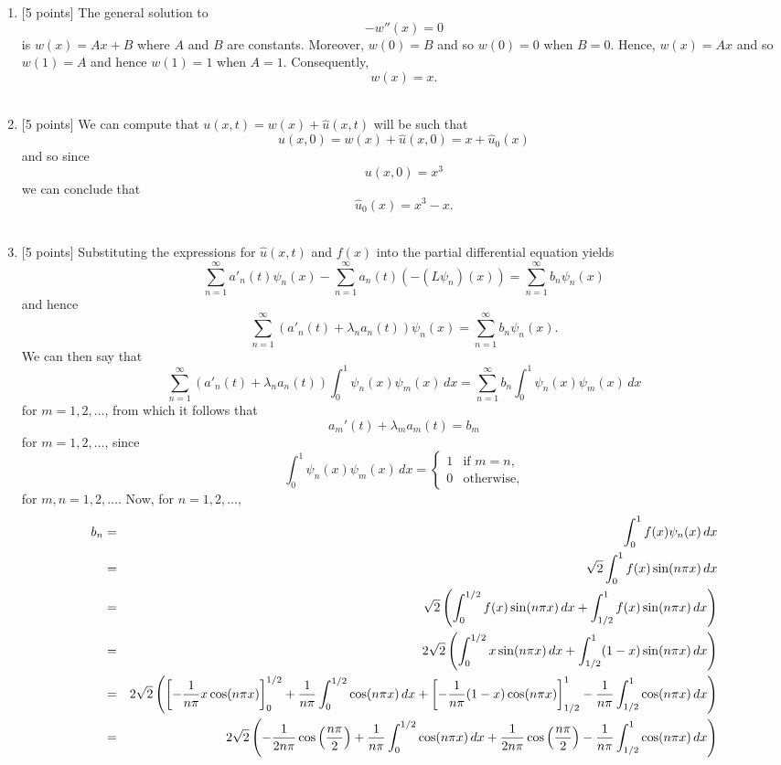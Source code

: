 \begin{solution}
\begin{enumerate}
\item {[5 points]} The general solution to
\[
-w''(x)=0
\]
is $w(x)=Ax+B$ where $A$ and $B$ are constants. Moreover, $w(0)=B$ and so $w(0)=0$ when $B=0$. Hence, $w(x)=Ax$ and so $w(1)=A$ and hence $w(1)=1$ when $A=1$. Consequently,
\[
w(x)=x.
\]
\\
\item {[5 points]} We can compute that $u(x,t)=w(x)+\hat{u}(x,t)$ will be such that
\[
u(x,0)=w(x)+\hat{u}(x,0)=x+\hat{u}_0(x)
\]
and so since
\[
u(x,0)=x^3
\]
we can conclude that
\[
\hat{u}_0(x)=x^3-x.
\]
\\
\item {[5 points]} Substituting the expressions for $\hat{u}(x,t)$ and $f(x)$ into the partial differential equation yields
\[
\sum_{n=1}^\infty a'_n(t) \psi_n (x)-\sum_{n=1}^\infty a_n(t) \left(-\left(L\psi_n\right) (x)\right)=\sum_{n=1}^\infty b_n \psi_n (x)
\]
and hence
\[
\sum_{n=1}^\infty \left(a'_n(t)+\lambda_na_n(t)\right)\psi_n (x)=\sum_{n=1}^\infty b_n \psi_n (x).
\]
We can then say that
\[
\sum_{n=1}^\infty \left(a'_n(t)+\lambda_na_n(t)\right)\int_0^1\psi_n (x)\psi_m (x)\,dx=\sum_{n=1}^\infty b_n \int_0^1\psi_n (x)\psi_m (x)\,dx
\]
for $m=1,2,\ldots$, from which it follows that
\[
a_m'(t)+\lambda_m a_m(t)=b_m
\]
for $m=1,2,\ldots$, since
\[
\int_0^1\psi_n (x)\psi_m (x)\,dx = \left\{\begin{array}{ll} 1 & \mbox{if }m=n, \\ 0 & \mbox{otherwise,} \end{array}\right.
\]
for $m,n=1,2,\ldots$. Now, for $n=1,2,\ldots$,
\begin{eqnarray*}
b_n&=&\int_0^1f(x)\psi_n(x)\,dx
\\
&=&\sqrt{2}\int_0^1 f(x)\sin(n\pi x)\,dx
\\
&=& \sqrt{2}\left(\int_0^{1/2} f(x)\sin(n\pi x)\,dx+\int_{1/2}^1 f(x)\sin(n\pi x)\,dx\right)
\\
&=& 2\sqrt{2}\left(\int_0^{1/2} x\sin(n\pi x)\,dx+\int_{1/2}^1 (1-x)\sin(n\pi x)\,dx\right)
\\
&=&2\sqrt{2}\left(\left[-{1 \over n\pi}x\cos(n\pi x)\right]_0^{1/2}+{1 \over n\pi}\int_0^{1/2} \cos(n\pi x)\,dx+\left[-{1 \over n\pi}(1-x)\cos(n\pi x)\right]_{1/2}^1-{1 \over n\pi}\int_{1/2}^1 \cos(n\pi x)\,dx\right)
\\
&=&2\sqrt{2}\left(-{1 \over 2n\pi}\cos\left({n\pi \over 2}\right)+{1 \over n\pi}\int_0^{1/2} \cos(n\pi x)\,dx+{1 \over 2n\pi}\cos\left({n\pi \over 2}\right)-{1 \over n\pi}\int_{1/2}^1 \cos(n\pi x)\,dx\right)

\end{eqnarray*}
\end{enumerate}
\end{solution}
